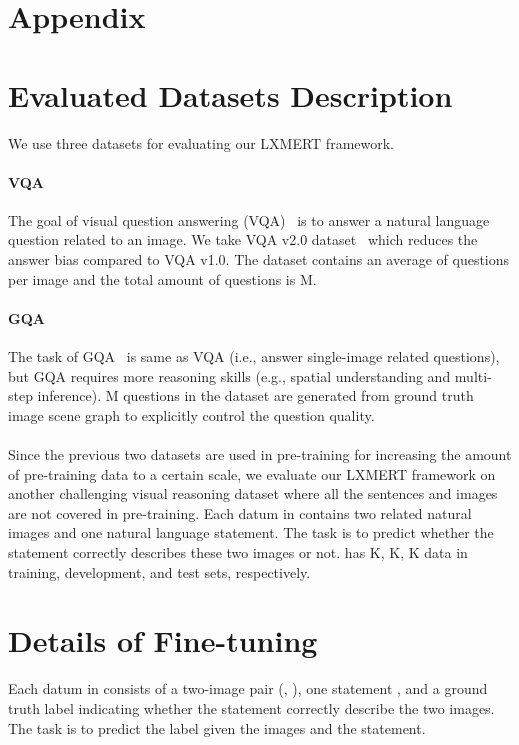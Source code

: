 \documentclass[11pt,a4paper]{article}
\newcommand\NLVR{}
\begin{document}



\appendix

\section*{Appendix}

\section{Evaluated Datasets Description}
We use three datasets for evaluating our LXMERT framework. 
\paragraph{VQA}
The goal of visual question answering (VQA)~\cite{antol2015vqa} is to answer a natural language question related to an image.
We take VQA v2.0 dataset~\cite{goyal2017making} which reduces the answer bias compared to VQA v1.0.
The dataset contains an average of  questions per image and the total amount of questions is M.
\paragraph{GQA}
The task of GQA~\cite{hudson2019gqa} is same as VQA (i.e., answer single-image related questions), but GQA requires more reasoning skills (e.g., spatial understanding and multi-step inference).
M questions in the dataset are generated from ground truth image scene graph to explicitly control the question quality.
\paragraph{\NLVR}
Since the previous two datasets are used in pre-training for increasing the amount of pre-training data to a certain scale, we evaluate our LXMERT framework on another challenging visual reasoning dataset  where all the sentences and images are not covered in pre-training.
Each datum in  contains two related natural images and one natural language statement. 
The task is to predict whether the statement correctly describes these two images or not.
 has K, K, K data in training, development, and test sets, respectively.


\section{Details of  Fine-tuning}
Each datum in  consists of a two-image pair (, ), one statement , and a ground truth label  indicating whether the statement correctly describe the two images.
The task is to predict the label  given the images and the statement.
\end{document}
